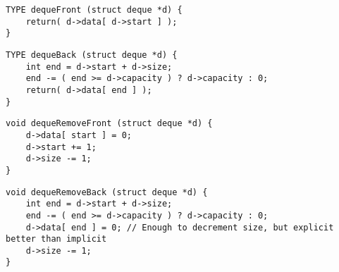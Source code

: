 \documentclass[12pt,letterpaper]{article}
\begin{document}
\begin{lstlisting}
TYPE dequeFront (struct deque *d) {
	return( d->data[ d->start ] );
}
\end{lstlisting}

\begin{lstlisting}
TYPE dequeBack (struct deque *d) {
    int end = d->start + d->size;
    end -= ( end >= d->capacity ) ? d->capacity : 0;
    return( d->data[ end ] );
}
\end{lstlisting}

\begin{lstlisting}
void dequeRemoveFront (struct deque *d) {
	d->data[ start ] = 0;
	d->start += 1;
	d->size -= 1;
}
\end{lstlisting}

\begin{lstlisting}
void dequeRemoveBack (struct deque *d) {
	int end = d->start + d->size;
    end -= ( end >= d->capacity ) ? d->capacity : 0;
    d->data[ end ] = 0; // Enough to decrement size, but explicit better than implicit
    d->size -= 1;
}
\end{lstlisting}
\end{document}
